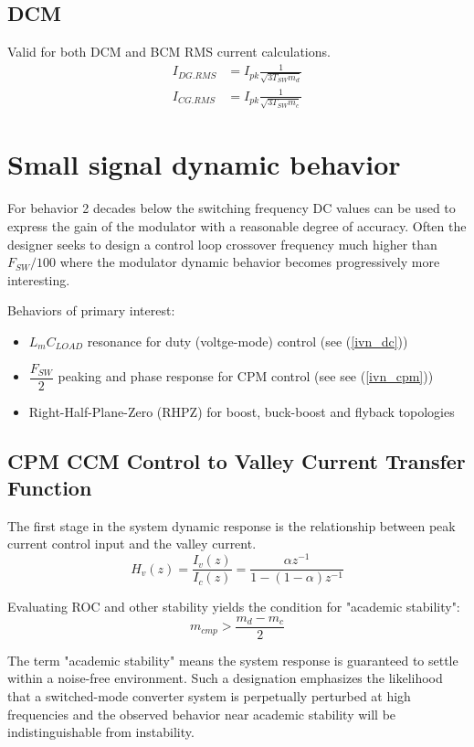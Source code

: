 \documentclass{scrartcl}
\begin{document}
	\subsection{DCM}
	Valid for both DCM and BCM RMS current calculations.
	\begin{align}	
		I_{DG.RMS} &= I_{pk} \frac{1}{\sqrt{3T_{SW}m_d}} \\
		I_{CG.RMS} &= I_{pk} \frac{1}{\sqrt{3T_{SW}m_c}}
	\end{align}
	
	\section{Small signal dynamic behavior}
	For behavior 2 decades below the switching frequency DC values can be used to express the gain of the modulator with a reasonable degree of accuracy.  Often the designer seeks to design a control loop crossover frequency much higher than $F_{SW}/100$ where the modulator dynamic behavior becomes progressively more interesting. 
	
	Behaviors of primary interest:
	\begin{itemize}
		\item $L_m C_{LOAD}$ resonance for duty (voltge-mode) control (see (\ref{ivn_dc}))
		\item $\dfrac{F_{SW}}{2}$ peaking and phase response for CPM control (see see (\ref{ivn_cpm}))
		\item Right-Half-Plane-Zero (RHPZ) for boost, buck-boost and flyback topologies 
	\end{itemize}
	
		\subsection{CPM CCM Control to Valley Current Transfer Function}
		The first stage in the system dynamic response is the relationship between peak current control input and the valley current. 
		\begin{equation}
		H_v(z) = \frac {I_v(z)} {I_c(z)} = \frac {\alpha z^{-1}} {1 - (1-\alpha) z^{-1}}  \label{hvz}
		\end{equation}
			
		Evaluating ROC and other stability yields the condition for "academic stability":
		\begin{equation}
		m_{cmp} > \dfrac{m_d - m_c}{2} \label{slope_stab}
		\end{equation}
		
		The term "academic stability" means the system response is guaranteed to settle within a noise-free environment.  Such a designation emphasizes the likelihood that a switched-mode converter system is perpetually perturbed at high frequencies and the observed behavior near academic stability will be indistinguishable from instability.
		
\end{document}

